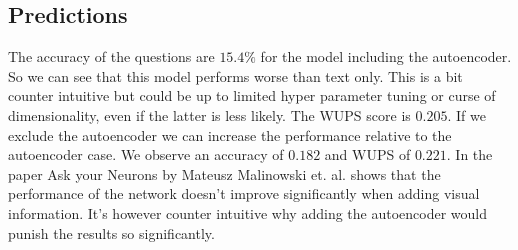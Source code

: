 \documentclass[10pt,a4paper]{report}
\begin{document}
	\subsection*{Predictions}
	The accuracy of the questions are $ 15.4\% $ for the model including the autoencoder. So we can see that this model performs worse than text only. This is a bit counter intuitive but could be up to limited hyper parameter tuning or curse of dimensionality, even if the latter is less likely. The WUPS score is $ 0.205 $. If we exclude the autoencoder we can increase the performance relative to the autoencoder case. We observe an accuracy of $ 0.182 $ and WUPS of $ 0.221 $. In the paper Ask your Neurons by Mateusz Malinowski et. al. shows that the performance of the network doesn't improve significantly when adding visual information. It's however counter intuitive why adding the autoencoder would punish the results so significantly.  
	
	
\end{document}
